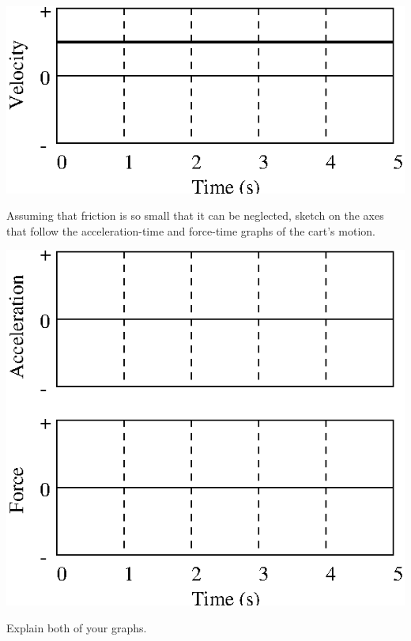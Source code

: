 \begin{enumerate}
\vspace{0.3cm}
{\par\centering \includegraphics{iqsForce/force1_fig8.eps} \par}
\vspace{0.8cm}

Assuming that friction is so small that it can be neglected, sketch on the axes
that follow the acceleration-time and force-time graphs of the cart's motion.

\vspace{0.3cm}
{\par\centering \includegraphics{iqsForce/force1_fig9.eps} \par}
\vspace{0.3cm}

Explain both of your graphs.
\vspace{20mm}


\end{enumerate}

